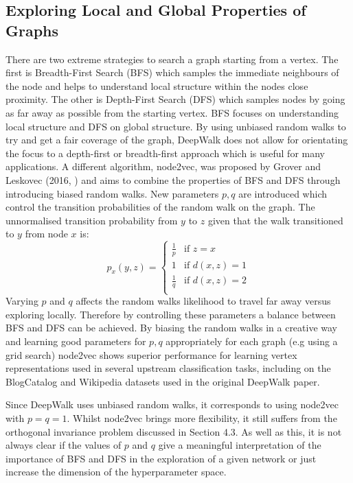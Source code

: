 \documentclass[a4paper]{article}
\begin{document}
\subsection{Exploring Local and Global Properties of Graphs}
There are two extreme strategies to search a graph starting from a vertex. The
first is Breadth-First Search (BFS) which samples the immediate neighbours of
the node and helps to understand local structure within the nodes close
proximity. The other is Depth-First Search (DFS) which samples nodes by going as
far away as possible from the starting vertex. BFS focuses on understanding
local structure and DFS on global structure. By using unbiased random walks to
try and get a fair coverage of the graph, DeepWalk does not allow for
orientating the focus to a depth-first or breadth-first approach which is useful
for many applications. A different algorithm, node2vec, was proposed by Grover
and Leskovec (2016, \cite{grover_leskovec2016}) and aims to combine the
properties of BFS and DFS through introducing biased random walks. New
parameters $p,q$ are introduced which control the transition probabilities of
the random walk on the graph. The unnormalised transition probability from $y$
to $z$ given that the walk transitioned to $y$ from node $x$ is:
\begin{equation*}
  p_x(y,z)= 
  \begin{cases}
    \frac{1}{p}& \text{if } z = x\\
    1          & \text{if } d(x,z) = 1\\
    \frac{1}{q}& \text{if } d(x,z) = 2\\
  \end{cases}
\end{equation*}
Varying $p$ and $q$ affects the random walks likelihood to travel far away
versus exploring locally. Therefore by controlling these parameters a balance
between BFS and DFS can be achieved. By biasing the random walks in a creative
way and learning good parameters for $p,q$ appropriately for each graph (e.g
using a grid search) node2vec shows superior performance for learning vertex
representations used in several upstream classification tasks, including on
the BlogCatalog and Wikipedia datasets used in the original DeepWalk paper.

Since DeepWalk uses unbiased random walks, it corresponds to using node2vec with $p=q=1$. Whilst node2vec brings
more flexibility, it still suffers from the orthogonal invariance problem discussed in Section 4.3. As well as this, it is not always clear if the values of $p$ and $q$ give a
meaningful interpretation of the importance of BFS and DFS in the exploration of a given network or just increase the dimension of the hyperparameter space.
\end{document}
